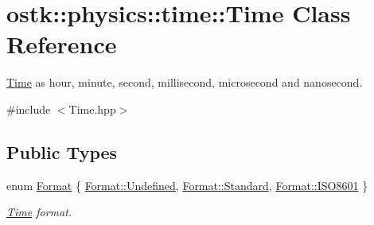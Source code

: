 \hypertarget{classostk_1_1physics_1_1time_1_1_time}{}\section{ostk\+:\+:physics\+:\+:time\+:\+:Time Class Reference}
\label{classostk_1_1physics_1_1time_1_1_time}


\hyperlink{classostk_1_1physics_1_1time_1_1_time}{Time} as hour, minute, second, millisecond, microsecond and nanosecond.  




{\ttfamily \#include $<$Time.\+hpp$>$}

\subsection*{Public Types}
\begin{DoxyCompactItemize}
\item 
enum \hyperlink{classostk_1_1physics_1_1time_1_1_time_a207e776746c45c3aaffcf7112b2bc951}{Format} \{ \hyperlink{classostk_1_1physics_1_1time_1_1_time_a207e776746c45c3aaffcf7112b2bc951aec0fc0100c4fc1ce4eea230c3dc10360}{Format\+::\+Undefined}, 
\hyperlink{classostk_1_1physics_1_1time_1_1_time_a207e776746c45c3aaffcf7112b2bc951aeb6d8ae6f20283755b339c0dc273988b}{Format\+::\+Standard}, 
\hyperlink{classostk_1_1physics_1_1time_1_1_time_a207e776746c45c3aaffcf7112b2bc951a35b6786739efcdc5a74ab1dca29d3b6b}{Format\+::\+I\+S\+O8601}
 \}\begin{DoxyCompactList}\small\item\em \hyperlink{classostk_1_1physics_1_1time_1_1_time}{Time} format. \end{DoxyCompactList}
\end{DoxyCompactItemize}
